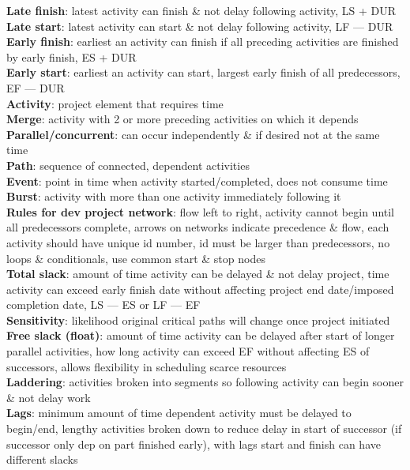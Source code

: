 \documentclass[a4paper]{article}
\begin{document}
\begin{multicols}{2}
        \textbf{Late finish}: latest activity can finish \& not delay following activity, LS + DUR\\
        \textbf{Late start}: latest activity can start \& not delay following activity, LF --- DUR\\
        \textbf{Early finish}: earliest an activity can finish if all preceding activities are finished by early finish, ES + DUR\\
        \textbf{Early start}: earliest an activity can start, largest early finish of all predecessors, EF ---  DUR\\
        \textbf{Activity}: project element that requires time\\
        \textbf{Merge}: activity with 2 or more preceding activities on which it depends\\
        \textbf{Parallel/concurrent}: can occur independently \& if desired not at the same time\\
        \textbf{Path}: sequence of connected, dependent activities\\
        \textbf{Event}: point in time when activity started/completed, does not consume time\\
        \textbf{Burst}: activity with more than one activity immediately following it\\
        \textbf{Rules for dev project network}: flow left to right, activity cannot begin until all predecessors complete, arrows on networks indicate precedence \& flow, each activity should have unique id number, id must be larger than predecessors, no loops \& conditionals, use common start \& stop nodes\\
        \textbf{Total slack}: amount of time activity can be delayed \& not delay project, time activity can exceed early finish date without affecting project end date/imposed completion date, LS --- ES or LF --- EF\\
        \textbf{Sensitivity}: likelihood original critical paths will change once project initiated\\
        \textbf{Free slack (float)}: amount of time activity can be delayed after start of longer parallel activities, how long activity can exceed EF without affecting ES of successors, allows flexibility in scheduling scarce resources\\
        \textbf{Laddering}: activities broken into segments so following activity can begin sooner \& not delay work\\
        \textbf{Lags}: minimum amount of time dependent activity must be delayed to begin/end, lengthy activities broken down to reduce delay in start of successor (if successor only dep on part finished early), with lags start and finish can have different slacks\\

\end{multicols}
\end{document}
